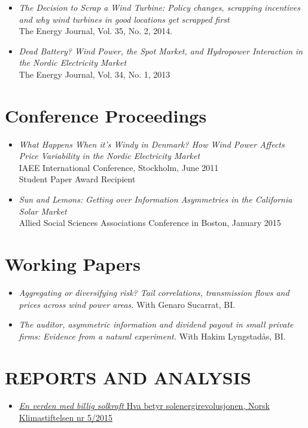 \documentclass[margin]{res}
\begin{document}
\begin{itemize}
\item[] \emph{The Decision to Scrap a Wind Turbine: Policy changes, scrapping incentives and why wind turbines in good locations get scrapped first}\\
The Energy Journal, Vol. 35, No. 2, 2014.

\item[] \emph{Dead Battery? Wind Power, the Spot Market, and Hydropower Interaction in the Nordic Electricity Market}\\
The Energy Journal, Vol. 34, No. 1, 2013
\end{itemize}

\normalsize{\section{Conference Proceedings}}
\begin{itemize}
\setlength{\itemsep}{10pt}
\item[] \emph{What Happens When it's Windy in Denmark? How Wind Power Affects Price Variability in the Nordic Electricity Market}\\
IAEE International Conference, Stockholm, June 2011  \\
Student Paper Award Recipient

\item[] \emph {Sun and Lemons: Getting over Information Asymmetries in the California Solar Market} \\
Allied Social Sciences Associations Conference in Boston, January 2015

\end{itemize}


\normalsize{\section{Working Papers}}
\begin{itemize}
\setlength{\itemsep}{10pt}

\item[] \emph{Aggregating or diversifying risk? Tail correlations, transmission flows and prices across wind power areas.} With Genaro Sucarrat, BI.
\item[] \emph{The auditor, asymmetric information and dividend payout in small private firms: Evidence from a natural experiment.} With Hakim Lyngstadås, BI.

\end{itemize}

\section{REPORTS AND ANALYSIS}
\begin{itemize}
\setlength{\itemsep}{5pt}
\item[] \href{http://klimastiftelsen.no/wp-content/uploads/2015/06/NK5_2015_Solenergirevolusjonen.pdf}{\emph{En verden med billig solkraft} Hva betyr solenergirevolusjonen, Norsk Klimastiftelsen nr 5/2015}
\end{itemize}
\end{document}
